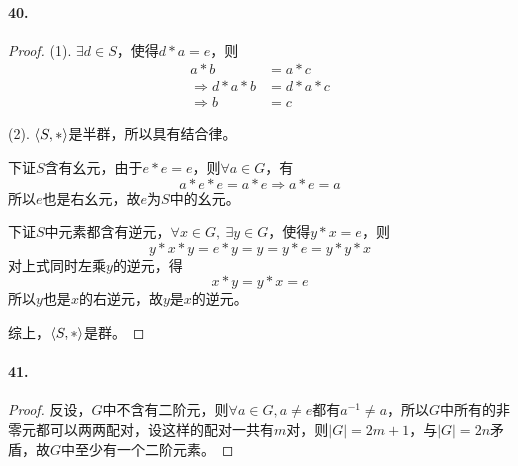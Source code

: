 \documentclass[12pt, a4paper, oneside]{ctexart}
\begin{document}
\paragraph{40.}\begin{proof}
    (1). $\exists d\in S$，使得$d*a = e$，则
    \begin{equation*}
        \begin{aligned}
            a*b&=a*c\\
            \Rightarrow  d*a*b&=d*a*c\\
            \Rightarrow  b&=c
        \end{aligned}
    \end{equation*}

    (2). $\braket{S,*}$是半群，所以具有结合律。

    下证$S$含有幺元，由于$e*e=e$，则$\forall a \in G$，有
    \begin{equation*}
        a*e*e=a*e\Rightarrow a*e = a
    \end{equation*}
    所以$e$也是右幺元，故$e$为$S$中的幺元。

    下证$S$中元素都含有逆元，$\forall x\in G,\ \exists y\in G$，使得$y*x = e$，则
    \begin{equation*}
        y*x*y=e*y=y=y*e=y*y*x
    \end{equation*}
    对上式同时左乘$y$的逆元，得
    \begin{equation*}
        x*y=y*x=e
    \end{equation*}
    所以$y$也是$x$的右逆元，故$y$是$x$的逆元。

    综上，$\braket{S,*}$是群。
\end{proof}
\paragraph{41.}\begin{proof}
    反设，$G$中不含有二阶元，则$\forall a\in G, a\neq e$都有$a^{-1}\neq a$，所以$G$中所有的非零元都可以两两配对，设这样的配对一共有$m$对，则$|G| = 2m+1$，与$|G| = 2n$矛盾，故$G$中至少有一个二阶元素。
\end{proof}
\end{document}
